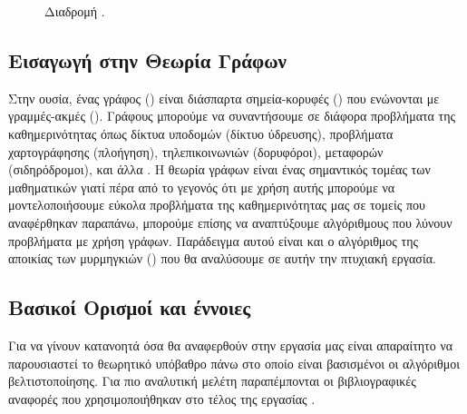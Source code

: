 \begin{figure}[ht]
\begin{minipage}[c]{.46\linewidth}
        \caption{Διαδρομή .}
        \label{4}
    \end{minipage}
\end{figure} 


\subsection{Εισαγωγή στην Θεωρία Γράφων}

Στην ουσία, ένας γράφος () είναι διάσπαρτα σημεία-κορυφές () που ενώνονται με γραμμές-ακμές (). Γράφους μπορούμε να συναντήσουμε σε διάφορα προβλήματα της καθημερινότητας όπως δίκτυα υποδομών (δίκτυο ύδρευσης), προβλήματα χαρτογράφησης (πλοήγηση), τηλεπικοινωνιών (δορυφόροι), μεταφορών (σιδηρόδρομοι), και άλλα \cite{manwlopoulos2014thewria}. Η θεωρία γράφων είναι ένας σημαντικός τομέας των μαθηματικών γιατί πέρα από το γεγονός ότι με χρήση αυτής μπορούμε να μοντελοποιήσουμε εύκολα προβλήματα της καθημερινότητας μας σε τομείς που αναφέρθηκαν παραπάνω, μπορούμε επίσης να αναπτύξουμε αλγόριθμους που λύνουν προβλήματα με χρήση γράφων. Παράδειγμα αυτού είναι και ο αλγόριθμος της αποικίας των μυρμηγκιών () που θα αναλύσουμε σε αυτήν την πτυχιακή εργασία.

\subsection{Βασικοί Ορισμοί και έννοιες}
Για να γίνουν κατανοητά όσα θα αναφερθούν στην εργασία μας είναι απαραίτητο να παρουσιαστεί το θεωρητικό υπόβαθρο πάνω στο οποίο είναι βασισμένοι οι αλγόριθμοι βελτιστοποίησης. Για πιο αναλυτική μελέτη παραπέμπονται οι βιβλιογραφικές αναφορές που χρησιμοποιήθηκαν στο τέλος της εργασίας \cite{bondy1976usr, perez2020introduction, Gewrgiadis2017thewria, gkertsis2023thewria, mavrovouniotis2014ant, ntenisiwtis2023thewria}.

